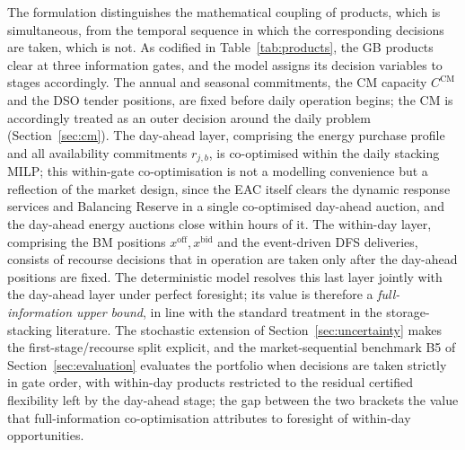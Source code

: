\documentclass[lettersize,journal]{IEEEtran}
\begin{document}
The formulation distinguishes the mathematical coupling of products, which is simultaneous, from the temporal sequence in which the corresponding decisions are taken, which is not. As codified in Table~\ref{tab:products}, the GB products clear at three information gates, and the model assigns its decision variables to stages accordingly. The annual and seasonal commitments, the CM capacity $C^{\mathrm{CM}}$ and the DSO tender positions, are fixed before daily operation begins; the CM is accordingly treated as an outer decision around the daily problem (Section~\ref{sec:cm}). The day-ahead layer, comprising the energy purchase profile and all availability commitments $r_{j,b}$, is co-optimised within the daily stacking MILP; this within-gate co-optimisation is not a modelling convenience but a reflection of the market design, since the EAC itself clears the dynamic response services and Balancing Reserve in a single co-optimised day-ahead auction, and the day-ahead energy auctions close within hours of it. The within-day layer, comprising the BM positions $x^{\mathrm{off}}, x^{\mathrm{bid}}$ and the event-driven DFS deliveries, consists of recourse decisions that in operation are taken only after the day-ahead positions are fixed. The deterministic model resolves this last layer jointly with the day-ahead layer under perfect foresight; its value is therefore a \emph{full-information upper bound}, in line with the standard treatment in the storage-stacking literature. The stochastic extension of Section~\ref{sec:uncertainty} makes the first-stage/recourse split explicit, and the market-sequential benchmark B5 of Section~\ref{sec:evaluation} evaluates the portfolio when decisions are taken strictly in gate order, with within-day products restricted to the residual certified flexibility left by the day-ahead stage; the gap between the two brackets the value that full-information co-optimisation attributes to foresight of within-day opportunities.
\end{document}
